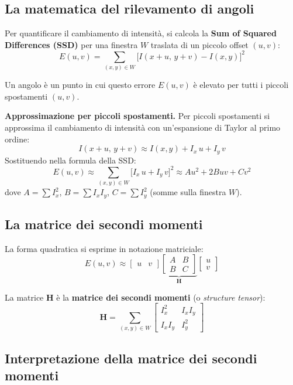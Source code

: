 \documentclass[12pt, a4paper]{report}
\begin{document}
\subsection{La matematica del rilevamento di angoli}

Per quantificare il cambiamento di intensità, si calcola la \textbf{Sum of Squared
Differences (SSD)} per una finestra $W$ traslata di un piccolo offset $(u,v)$:
\[
  E(u,v) = \sum_{(x,y)\in W} \bigl[I(x+u,\,y+v) - I(x,y)\bigr]^2
\]

Un angolo è un punto in cui questo errore $E(u,v)$ è elevato per tutti i piccoli
spostamenti $(u,v)$.

\textbf{Approssimazione per piccoli spostamenti.}  Per piccoli spostamenti si
approssima il cambiamento di intensità con un'espansione di Taylor al primo ordine:
\[
  I(x+u,\,y+v) \approx I(x,y) + I_x\,u + I_y\,v
\]
Sostituendo nella formula della SSD:
\[
  E(u,v) \approx \sum_{(x,y)\in W}\bigl[I_x\,u + I_y\,v\bigr]^2
  \approx Au^2 + 2Buv + Cv^2
\]
dove $A = \sum I_x^2$, $B = \sum I_x I_y$, $C = \sum I_y^2$
(somme sulla finestra $W$).

\subsection{La matrice dei secondi momenti}

La forma quadratica si esprime in notazione matriciale:
\[
  E(u,v) \approx
  \begin{bmatrix}u & v\end{bmatrix}
  \underbrace{\begin{bmatrix}A & B \\ B & C\end{bmatrix}}_{\mathbf{H}}
  \begin{bmatrix}u \\ v\end{bmatrix}
\]

La matrice $\mathbf{H}$ è la \textbf{matrice dei secondi momenti} (o
\emph{structure tensor}):
\[
  \mathbf{H} = \sum_{(x,y)\in W}
  \begin{bmatrix}I_x^2 & I_x I_y \\ I_x I_y & I_y^2\end{bmatrix}
\]

\subsection{Interpretazione della matrice dei secondi momenti}
\end{document}
